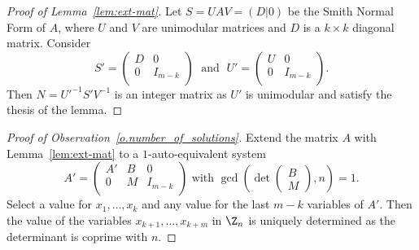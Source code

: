  \begin {proof} 
 [Proof of Lemma~\ref {lem:ext-mat}] Let $S=UAV=(D|0)$ be the Smith Normal Form of $A$, where $U$ and $V$ are unimodular matrices and $D$ is a $k\times k$ diagonal matrix. Consider \begin {displaymath} S'=\begin {pmatrix} D & 0\\ 0 & I_{m-k}\\ \end {pmatrix}\; \text { and }\; U'=\begin {pmatrix} U & 0 \\ 0 & I_{m-k} \\ \end {pmatrix}. \end {displaymath} Then $N=U'^{-1} S' V^{-1}$ is an integer matrix as $U'$ is unimodular and satisfy the thesis of the lemma.
 \end {proof} 
 
 \begin {proof} 
 [Proof of Observation~\ref {o.number_of_solutions}] Extend the matrix $A$ with Lemma~\ref {lem:ext-mat} to a $1$-auto-equivalent system \begin {displaymath} A'= \begin {pmatrix} A' & B & 0\\ 0 & M & I_{m-k}\\ \end {pmatrix} \text { with } \gcd \left (\det \begin {pmatrix} B \\ M \end {pmatrix},n\right )=1. \end {displaymath} Select a value for $x_1,\ldots ,x_k$ and any value for the last $m-k$ variables of $A'$. Then the value of the variables $x_{k+1},\ldots ,x_{k+m}$ in $\Z _n$ is uniquely determined as the determinant is coprime with $n$.
 \end {proof} 
 
